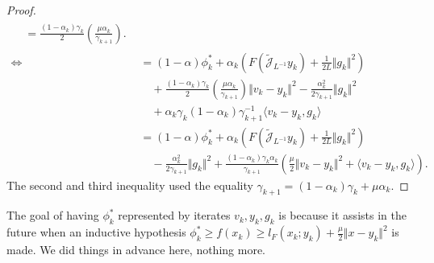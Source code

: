 \documentclass[12pt]{article}
\begin{document}
\begin{proof}
\begin{align*}
{\begin{aligned}
                    &= 
                    \frac{(1 - \alpha_k)\gamma_k}{2}
                    \left(
                        \frac{\mu \alpha_k}{\gamma_{k + 1}}
                    \right). 
                \end{aligned}
            }
            \\
            \iff 
            &= 
                (1 - \alpha)\phi_k^* + 
                \alpha_k
                \left(
                    F\left(\widetilde{\mathcal J}_{L^{-1}} y_k\right) + 
                    \frac{1}{2L}\Vert g_k\Vert^2
                \right)
                \\
                &\quad 
                + 
                \frac{(1 - \alpha_k)\gamma_k}{2}
                \left(
                    \frac{\mu \alpha_k}{\gamma_{k + 1}}
                \right)
                \Vert v_k - y_k\Vert^2
                - \frac{\alpha_k^2}{2\gamma_{k + 1}}\Vert g_k\Vert^2
                \\
                & \quad 
                + \alpha_k\gamma_k(1 - \alpha_k)\gamma_{k + 1}^{-1}\langle v_k -y_k, g_k\rangle
            \\
            &= 
                (1 - \alpha)\phi_k^* 
                + 
                \alpha_k
                \left(
                    F\left(\widetilde{\mathcal J}_{L^{-1}} y_k\right) + 
                    \frac{1}{2L}\Vert g_k\Vert^2
                \right)
                \\
                &\quad 
                - 
                \frac{\alpha_k^2}{2\gamma_{k + 1}}\Vert g_k\Vert^2
                + 
                \frac{(1 - \alpha_k)\gamma_k\alpha_k}{\gamma_{k + 1}}
                \left(
                    \frac{\mu}{2}\Vert v_k - y_k\Vert^2
                    + \langle v_k - y_k, g_k\rangle
                \right). 
        \end{align*}
        The second and third inequality used the equality $\gamma_{k + 1} = (1 - \alpha_k)\gamma_k + \mu \alpha_k$. 
    \end{proof}
    \begin{remark}
        The goal of having $\phi_k^*$ represented by iterates $v_k, y_k, g_k$ is because it assists in the future when an inductive hypothesis $\phi_k^* \ge f(x_k) \ge l_F(x_k; y_k) + \frac{\mu}{2}\Vert x - y_k\Vert^2$ is made. 
        We did things in advance here, nothing more. 
    \end{remark}
    
\end{document}
